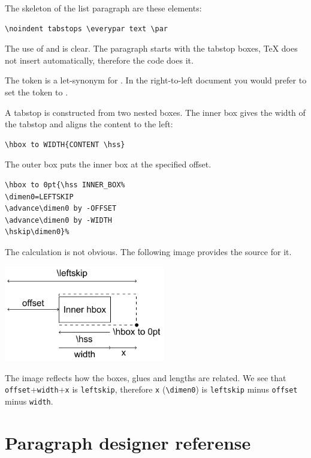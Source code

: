 \documentclass[]{ltugboat}
\begin{document}
The skeleton of the list paragraph are these elements:

\begin{verbatim}
\noindent tabstops \everypar text \par
\end{verbatim}

The use of  and  is clear. The paragraph starts with the tabstop boxes, \TeX{} does not insert  automatically, therefore the code does it.

The token  is a let-synonym for . In the right-to-left document you would prefer to set the token to .

A tabstop is constructed from two nested boxes. The inner box gives the width of the tabstop and aligns the content to the left:

\begin{verbatim}
\hbox to WIDTH{CONTENT \hss}
\end{verbatim}

The outer box puts the inner box at the specified offset.

\begin{verbatim}
\hbox to 0pt{\hss INNER_BOX%
\dimen0=LEFTSKIP
\advance\dimen0 by -OFFSET
\advance\dimen0 by -WIDTH
\hskip\dimen0}%
\end{verbatim}

The calculation is not obvious. The following image provides the source for it.

\includegraphics[width=7cm]{calculations.pdf}

The image reflects how the boxes, glues and lengths are related. We see that \verb|offset|+\verb|width|+\verb|x| is \verb|leftskip|, therefore \verb|x| (\verb|\dimen0|) is \verb|leftskip| minus \verb|offset| minus \verb|width|.


\section{Paragraph designer referense}
\end{document}
